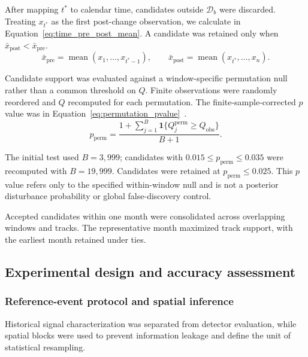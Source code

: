 After mapping $t^*$ to calendar time, candidates outside $\mathcal{D}_b$ were discarded. Treating $x_{t^*}$ as the first post-change observation, we calculate in Equation~\eqref{eq:time_pre_post_mean}. A candidate was retained only when $\bar{x}_{\mathrm{post}}<\bar{x}_{\mathrm{pre}}$.
\begin{equation}
    \label{eq:time_pre_post_mean}
    \bar{x}_{\mathrm{pre}}
    =\operatorname{mean}(x_1,\ldots,x_{t^*-1}),
    \qquad
    \bar{x}_{\mathrm{post}}
    =\operatorname{mean}(x_{t^*},\ldots,x_n).
\end{equation}



Candidate support was evaluated against a window-specific permutation null rather than a common threshold on $Q$. Finite observations were randomly reordered and $Q$ recomputed for each permutation. The finite-sample-corrected $p$ value was in Equation~\eqref{eq:permutation_pvalue}~\citep{PhipsonSmyth2010Permutation}.
\begin{equation}
    p_{\mathrm{perm}}
    =
    \frac{
    1+\sum_{j=1}^{B}
    \mathbf{1}\{Q_j^{\mathrm{perm}}\ge Q_{\mathrm{obs}}\}
    }{B+1}.
    \label{eq:permutation_pvalue}
\end{equation}

The initial test used $B=3{,}999$; candidates with $0.015\le p_{\mathrm{perm}}\le0.035$ were recomputed with $B=19{,}999$. Candidates were retained at $p_{\mathrm{perm}}\le0.025$. This $p$ value refers only to the specified within-window null and is not a posterior disturbance probability or global false-discovery control.

Accepted candidates within one month were consolidated across overlapping windows and tracks. The representative month maximized track support, with the earliest month retained under ties.





\subsection{Experimental design and accuracy assessment}
\label{sec:experimental_evaluation}

\subsubsection{Reference-event protocol and spatial inference}


Historical signal characterization was separated from detector evaluation,
while spatial blocks were used to prevent information leakage and define
the unit of statistical resampling.

